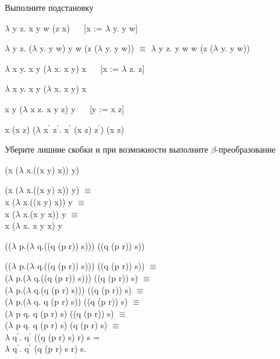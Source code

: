 \documentclass[a4paper,12pt]{article} %
\begin{document}
\begin{enumerate}
{\item Выполните подстановку}

\begin{enumerate}
{\item $\lambda$ y z. x y w (z x) $\quad$ [x := $\lambda$ y. y w]}

$\lambda$ y z. ($\lambda$ y. y w) y w (z ($\lambda$ y. y w)) $\equiv$ $\lambda$ y z. y w w (z ($\lambda$ y. y w))

{\item $\lambda$ x y. x y ($\lambda$ x. x y) x $\quad$ [x := $\lambda$ z. z]}

$\lambda$ x y. x y ($\lambda$ x. x y) x

{\item x y ($\lambda$ x z. x y z) y $\quad$ [y := x z]}

x (x z) ($\lambda$ x$^\prime$ z$^\prime$. x$^\prime$ (x z) z$^\prime$) (x z)

\end{enumerate}

{\item Уберите лишние скобки и при возможности выполните $\beta$-преобразование}

\begin{enumerate}

{\item (x ($\lambda$ x.((x y) x)) y)}

{\color{red}(}x ($\lambda$ x.((x y) x)) y{\color{red})} $\equiv$ \\
x ($\lambda$ x.({\color{red}(}x y{\color{red})} x)) y $\equiv$ \\
x ($\lambda$ x.{\color{red}(}x y x{\color{red})}) y $\equiv$ \\
x ($\lambda$ x. x y x) y

{\item (($\lambda$ p.($\lambda$ q.((q (p r)) s))) ((q (p r)) s))}

{\color{red}(}($\lambda$ p.($\lambda$ q.((q (p r)) s))) ((q (p r)) s){\color{red})} $\equiv$ \\
($\lambda$ p.($\lambda$ q.({\color{red}(}q (p r){\color{red})} s))) ((q (p r)) s) $\equiv$ \\
($\lambda$ p.($\lambda$ q.{\color{red}(}q (p r) s{\color{red})})) ((q (p r)) s) $\equiv$ \\
($\lambda$ p.{\color{red}(}$\lambda$ q. q (p r) s{\color{red})}) ((q (p r)) s) $\equiv$ \\
($\lambda$ p q. q (p r) s) ({\color{red}(}q (p r){\color{red})} s) $\equiv$ \\
($\lambda$ p q. q (p r) s) (q (p r) s) $\equiv$ \\
$\lambda$ q$^\prime$. q$^\prime$ ({\color{red}(}q (p r) s{\color{red})} r) s = \\
$\lambda$ q$^\prime$. q$^\prime$ (q (p r) s r) s.


\end{enumerate}
\end{enumerate}
\end{document}
